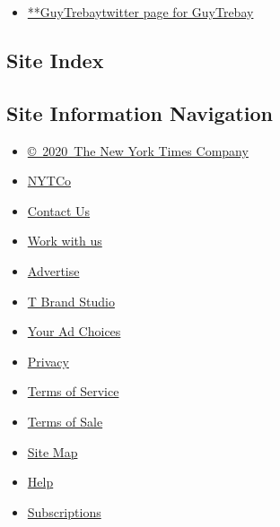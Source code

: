 \begin{itemize}
\tightlist
\item
  \href{https://twitter.com/GuyTrebay}{**GuyTrebaytwitter page for
  GuyTrebay}
\end{itemize}

\hypertarget{site-index}{%
\subsection{Site Index}\label{site-index}}

\hypertarget{site-information-navigation}{%
\subsection{Site Information
Navigation}\label{site-information-navigation}}

\begin{itemize}
\tightlist
\item
  \href{https://help.nytimes3xbfgragh.onion/hc/en-us/articles/115014792127-Copyright-notice}{©~2020~The
  New York Times Company}
\end{itemize}

\begin{itemize}
\tightlist
\item
  \href{https://www.nytco.com/}{NYTCo}
\item
  \href{https://help.nytimes3xbfgragh.onion/hc/en-us/articles/115015385887-Contact-Us}{Contact
  Us}
\item
  \href{https://www.nytco.com/careers/}{Work with us}
\item
  \href{https://nytmediakit.com/}{Advertise}
\item
  \href{http://www.tbrandstudio.com/}{T Brand Studio}
\item
  \href{https://www.nytimes3xbfgragh.onion/privacy/cookie-policy\#how-do-i-manage-trackers}{Your
  Ad Choices}
\item
  \href{https://www.nytimes3xbfgragh.onion/privacy}{Privacy}
\item
  \href{https://help.nytimes3xbfgragh.onion/hc/en-us/articles/115014893428-Terms-of-service}{Terms
  of Service}
\item
  \href{https://help.nytimes3xbfgragh.onion/hc/en-us/articles/115014893968-Terms-of-sale}{Terms
  of Sale}
\item
  \href{https://spiderbites.nytimes3xbfgragh.onion}{Site Map}
\item
  \href{https://help.nytimes3xbfgragh.onion/hc/en-us}{Help}
\item
  \href{https://www.nytimes3xbfgragh.onion/subscription?campaignId=37WXW}{Subscriptions}
\end{itemize}

